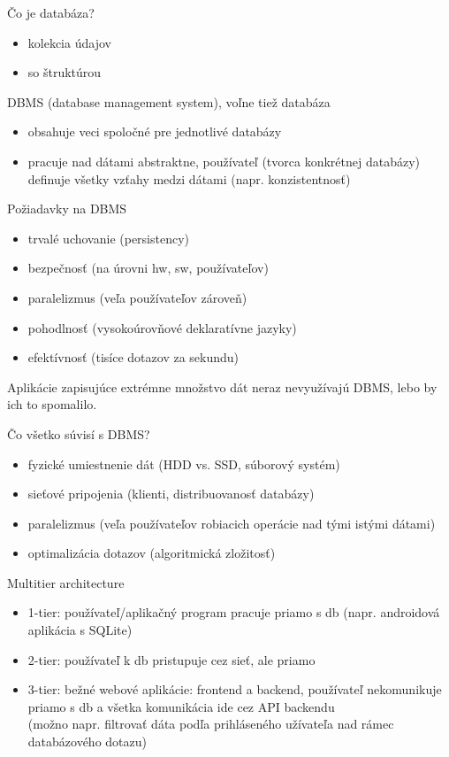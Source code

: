 \documentclass[12pt]{beamer}
\begin{document}
\begin{frame}{Čo je databáza?}
\begin{itemize}
\item kolekcia údajov
\item so štruktúrou
\end{itemize}
\vskip 1cm
\pause
DBMS (database management system), voľne tiež databáza
\begin{itemize}
\item obsahuje veci spoločné pre jednotlivé databázy
\item pracuje nad dátami abstraktne, používateľ (tvorca konkrétnej databázy) definuje všetky vzťahy medzi dátami (napr. konzistentnosť)
\end{itemize}
\end{frame}

\begin{frame}{Požiadavky na DBMS}
\begin{itemize}
\item trvalé uchovanie (persistency)
\item bezpečnosť (na úrovni hw, sw, používateľov)
\item paralelizmus (veľa používateľov zároveň)
\item pohodlnosť (vysokoúrovňové deklaratívne jazyky)
\item efektívnosť (tisíce dotazov za sekundu)
\end{itemize}
\bigskip
\pause
Aplikácie zapisujúce extrémne množstvo dát neraz nevyužívajú DBMS, lebo by ich to spomalilo.
\end{frame}

\begin{frame}{Čo všetko súvisí s DBMS?}
\begin{itemize}
\item fyzické umiestnenie dát (HDD vs. SSD, súborový systém)
\item sieťové pripojenia (klienti, distribuovanosť databázy)
\item paralelizmus (veľa používateľov robiacich operácie nad tými istými dátami)
\item optimalizácia dotazov (algoritmická zložitosť)
\end{itemize}
\end{frame}

\begin{frame}{Multitier architecture}
\begin{itemize}
\item 1-tier: používateľ/aplikačný program pracuje priamo s db (napr. androidová aplikácia s SQLite)
\item 2-tier: používateľ k db pristupuje cez sieť, ale priamo
\pause
\item 3-tier: bežné webové aplikácie: frontend a backend, používateľ nekomunikuje priamo s db a všetka komunikácia ide cez API backendu\\
	(možno napr. filtrovať dáta podľa prihláseného užívateľa nad rámec databázového dotazu)
\end{itemize}
\end{frame}
\end{document}
